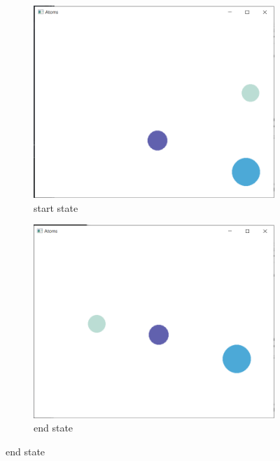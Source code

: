 \documentclass[11pt,titlepage]{article}
\begin{document}
			\begin{figure}[h!]
				\centering
				\begin{subfigure}{.5\textwidth}
					\centering
					\includegraphics[scale=0.5]{pictures/random_collision.png}
					\caption{start state}
				\end{subfigure}%
				\begin{subfigure}{.5\textwidth}
					\centering
					\includegraphics[scale=0.5]{pictures/random_collision_final.png}
					\caption{end state}
				\end{subfigure}
			\end{figure}
						
\end{document}

